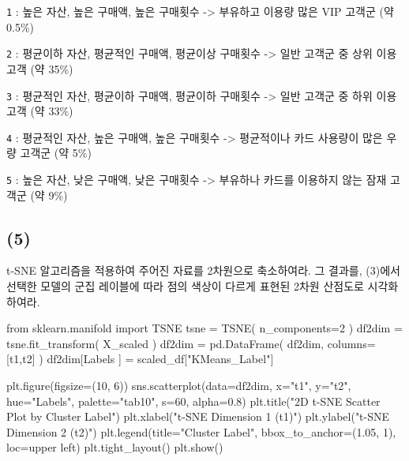\documentclass[
  a4paper,
  DIV=11,
  numbers=noendperiod]{scrreprt}
\newenvironment{Shaded}{\begin{snugshade}}{\end{snugshade}}
\newcommand{\DecValTok}[1]{\textcolor[rgb]{0.68,0.00,0.00}{#1}}
\newcommand{\FloatTok}[1]{\textcolor[rgb]{0.68,0.00,0.00}{#1}}
\newcommand{\ImportTok}[1]{\textcolor[rgb]{0.00,0.46,0.62}{#1}}
\newcommand{\NormalTok}[1]{\textcolor[rgb]{0.00,0.23,0.31}{#1}}
\newcommand{\OperatorTok}[1]{\textcolor[rgb]{0.37,0.37,0.37}{#1}}
\newcommand{\StringTok}[1]{\textcolor[rgb]{0.13,0.47,0.30}{#1}}
\begin{document}
\texttt{1} : 높은 자산, 높은 구매액, 높은 구매횟수 -\textgreater{}
부유하고 이용량 많은 VIP 고객군 (약 0.5\%)

\texttt{2} : 평균이하 자산, 평균적인 구매액, 평균이상 구매횟수
-\textgreater{} 일반 고객군 중 상위 이용고객 (약 35\%)

\texttt{3} : 평균적인 자산, 평균이하 구매액, 평균이하 구매횟수
-\textgreater{} 일반 고객군 중 하위 이용고객 (약 33\%)

\texttt{4} : 평균적인 자산, 높은 구매액, 높은 구매횟수 -\textgreater{}
평균적이나 카드 사용량이 많은 우량 고객군 (약 5\%)

\texttt{5} : 높은 자산, 낮은 구매액, 낮은 구매횟수 -\textgreater{}
부유하나 카드를 이용하지 않는 잠재 고객군 (약 9\%)

\subsection{(5)}\label{section-7}

t-SNE 알고리즘을 적용하여 주어진 자료를 2차원으로 축소하여라. 그 결과를,
(3)에서 선택한 모델의 군집 레이블에 따라 점의 색상이 다르게 표현된 2차원
산점도로 시각화하여라.

\begin{Shaded}
\begin{Highlighting}[]
\ImportTok{from}\NormalTok{ sklearn.manifold }\ImportTok{import}\NormalTok{ TSNE}
\NormalTok{tsne }\OperatorTok{=}\NormalTok{ TSNE( n\_components}\OperatorTok{=}\DecValTok{2}\NormalTok{ )}
\NormalTok{df2dim }\OperatorTok{=}\NormalTok{ tsne.fit\_transform( X\_scaled )}
\NormalTok{df2dim }\OperatorTok{=}\NormalTok{ pd.DataFrame( df2dim, columns}\OperatorTok{=}\NormalTok{[}\StringTok{\textquotesingle{}t1\textquotesingle{}}\NormalTok{,}\StringTok{\textquotesingle{}t2\textquotesingle{}}\NormalTok{] )}
\NormalTok{df2dim[}\StringTok{\textquotesingle{}Labels\textquotesingle{}}\NormalTok{ ] }\OperatorTok{=}\NormalTok{ scaled\_df[}\StringTok{"KMeans\_Label"}\NormalTok{]}

\NormalTok{plt.figure(figsize}\OperatorTok{=}\NormalTok{(}\DecValTok{10}\NormalTok{, }\DecValTok{6}\NormalTok{))}
\NormalTok{sns.scatterplot(data}\OperatorTok{=}\NormalTok{df2dim, x}\OperatorTok{=}\StringTok{"t1"}\NormalTok{, y}\OperatorTok{=}\StringTok{"t2"}\NormalTok{, hue}\OperatorTok{=}\StringTok{"Labels"}\NormalTok{, palette}\OperatorTok{=}\StringTok{"tab10"}\NormalTok{, s}\OperatorTok{=}\DecValTok{60}\NormalTok{, alpha}\OperatorTok{=}\FloatTok{0.8}\NormalTok{)}
\NormalTok{plt.title(}\StringTok{"2D t{-}SNE Scatter Plot by Cluster Label"}\NormalTok{)}
\NormalTok{plt.xlabel(}\StringTok{"t{-}SNE Dimension 1 (t1)"}\NormalTok{)}
\NormalTok{plt.ylabel(}\StringTok{"t{-}SNE Dimension 2 (t2)"}\NormalTok{)}
\NormalTok{plt.legend(title}\OperatorTok{=}\StringTok{"Cluster Label"}\NormalTok{, bbox\_to\_anchor}\OperatorTok{=}\NormalTok{(}\FloatTok{1.05}\NormalTok{, }\DecValTok{1}\NormalTok{), loc}\OperatorTok{=}\StringTok{\textquotesingle{}upper left\textquotesingle{}}\NormalTok{)}
\NormalTok{plt.tight\_layout()}
\NormalTok{plt.show()}
\end{Highlighting}
\end{Shaded}
\end{document}
